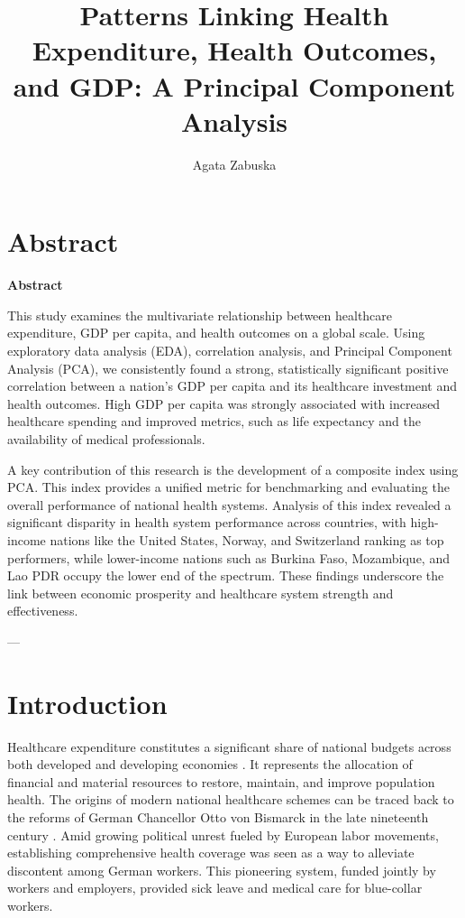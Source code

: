 \documentclass[11pt, a4paper]{article}
\title{Patterns Linking Health Expenditure, Health Outcomes, and GDP: A Principal Component Analysis}
\author{Agata Zabuska}
\date{}
\begin{document}
\maketitle
\thispagestyle{empty} %

\newpage
\tableofcontents
\thispagestyle{empty} %
\newpage

\section*{Abstract}
\begin{center}
    \textbf{Abstract}
\end{center}
\vspace{1em}
This study examines the multivariate relationship between healthcare expenditure, GDP per capita, and health outcomes on a global scale. Using exploratory data analysis (EDA), correlation analysis, and Principal Component Analysis (PCA), we consistently found a strong, statistically significant positive correlation between a nation's GDP per capita and its healthcare investment and health outcomes. High GDP per capita was strongly associated with increased healthcare spending and improved metrics, such as life expectancy and the availability of medical professionals.

A key contribution of this research is the development of a composite index using PCA. This index provides a unified metric for benchmarking and evaluating the overall performance of national health systems. Analysis of this index revealed a significant disparity in health system performance across countries, with high-income nations like the United States, Norway, and Switzerland ranking as top performers, while lower-income nations such as Burkina Faso, Mozambique, and Lao PDR occupy the lower end of the spectrum. These findings underscore the link between economic prosperity and healthcare system strength and effectiveness.

---

\section{Introduction}

Healthcare expenditure constitutes a significant share of national budgets across both developed \parencite{Sterlin2024} and developing economies \parencite{health}. It represents the allocation of financial and material resources to restore, maintain, and improve population health. The origins of modern national healthcare schemes can be traced back to the reforms of German Chancellor Otto von Bismarck in the late nineteenth century \parencite{busse2017}. Amid growing political unrest fueled by European labor movements, establishing comprehensive health coverage was seen as a way to alleviate discontent among German workers. This pioneering system, funded jointly by workers and employers, provided sick leave and medical care for blue-collar workers.  
\end{document}
